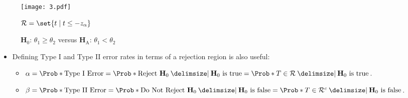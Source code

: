 \begin{figure}[!htbp]
      \centering
      \texttt{[image: 3.pdf]}
      \caption{$ \mathbf{H}_0 $: $ \theta_1\ge\theta_2 $ versus $ \mathbf{H}_\text{A} $: $ \theta_1<\theta_2 $}{$ \mathcal{R}=\set{t\mid t\le -z_{\alpha}} $}
\end{figure}
\begin{itemize}
      \item Defining Type I and Type II error rates in terms of a rejection region is also useful:
            \begin{itemize}
                  \item $ \alpha=\Prob*{\text{Type I Error}}=\Prob*{\text{Reject $ \mathbf{H}_0 $}\given \text{$ \mathbf{H}_0 $ is true}}=\Prob*{T\in\mathcal{R}\given \text{$ \mathbf{H}_0 $ is true}} $.
                  \item $ \beta=\Prob*{\text{Type II Error}}=\Prob*{\text{Do Not Reject $ \mathbf{H}_0 $}\given \text{$ \mathbf{H}_0 $ is false}}=\Prob*{T\in\mathcal{R}^c\given \text{$ \mathbf{H}_0 $ is false}} $.
            \end{itemize}
\end{itemize}
